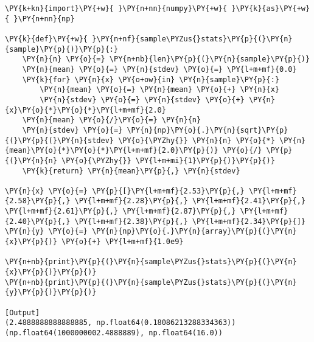 \begin{Verbatim}[label=\makebox{\href{https://github.com/unipi-physics-labs/lab1-notes/tree/main/snippy/sample_stat_single.py}{https://github.com/.../sample\_stat\_single.py}},commandchars=\\\{\}]
\PY{k+kn}{import}\PY{+w}{ }\PY{n+nn}{numpy}\PY{+w}{ }\PY{k}{as}\PY{+w}{ }\PY{n+nn}{np}

\PY{k}{def}\PY{+w}{ }\PY{n+nf}{sample\PYZus{}stats}\PY{p}{(}\PY{n}{sample}\PY{p}{)}\PY{p}{:}
    \PY{n}{n} \PY{o}{=} \PY{n+nb}{len}\PY{p}{(}\PY{n}{sample}\PY{p}{)}
    \PY{n}{mean} \PY{o}{=} \PY{n}{stdev} \PY{o}{=} \PY{l+m+mf}{0.0}
    \PY{k}{for} \PY{n}{x} \PY{o+ow}{in} \PY{n}{sample}\PY{p}{:}
        \PY{n}{mean} \PY{o}{=} \PY{n}{mean} \PY{o}{+} \PY{n}{x}
        \PY{n}{stdev} \PY{o}{=} \PY{n}{stdev} \PY{o}{+} \PY{n}{x}\PY{o}{*}\PY{o}{*}\PY{l+m+mf}{2.0}
    \PY{n}{mean} \PY{o}{/}\PY{o}{=} \PY{n}{n}
    \PY{n}{stdev} \PY{o}{=} \PY{n}{np}\PY{o}{.}\PY{n}{sqrt}\PY{p}{(}\PY{p}{(}\PY{n}{stdev} \PY{o}{\PYZhy{}} \PY{n}{n} \PY{o}{*} \PY{n}{mean}\PY{o}{*}\PY{o}{*}\PY{l+m+mf}{2.0}\PY{p}{)} \PY{o}{/} \PY{p}{(}\PY{n}{n} \PY{o}{\PYZhy{}} \PY{l+m+mi}{1}\PY{p}{)}\PY{p}{)}
    \PY{k}{return} \PY{n}{mean}\PY{p}{,} \PY{n}{stdev}

\PY{n}{x} \PY{o}{=} \PY{p}{[}\PY{l+m+mf}{2.53}\PY{p}{,} \PY{l+m+mf}{2.58}\PY{p}{,} \PY{l+m+mf}{2.28}\PY{p}{,} \PY{l+m+mf}{2.41}\PY{p}{,} \PY{l+m+mf}{2.61}\PY{p}{,} \PY{l+m+mf}{2.87}\PY{p}{,} \PY{l+m+mf}{2.40}\PY{p}{,} \PY{l+m+mf}{2.38}\PY{p}{,} \PY{l+m+mf}{2.34}\PY{p}{]}
\PY{n}{y} \PY{o}{=} \PY{n}{np}\PY{o}{.}\PY{n}{array}\PY{p}{(}\PY{n}{x}\PY{p}{)} \PY{o}{+} \PY{l+m+mf}{1.0e9}

\PY{n+nb}{print}\PY{p}{(}\PY{n}{sample\PYZus{}stats}\PY{p}{(}\PY{n}{x}\PY{p}{)}\PY{p}{)}
\PY{n+nb}{print}\PY{p}{(}\PY{n}{sample\PYZus{}stats}\PY{p}{(}\PY{n}{y}\PY{p}{)}\PY{p}{)}

[Output]
(2.4888888888888885, np.float64(0.18086213288334363))
(np.float64(1000000002.4888889), np.float64(16.0))
\end{Verbatim}

